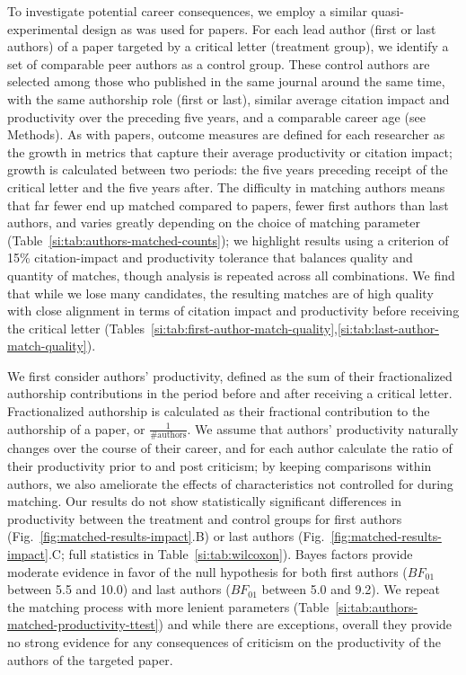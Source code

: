 \documentclass[12pt,a4paper]{article}
\numberwithin{equation}{section}
\def\methods{Methods}
\begin{document}
To investigate potential career consequences, we employ a similar quasi-experimental design as was used for papers.
For each lead author (first or last authors) of a paper targeted by a critical letter (treatment group), we identify a set of comparable peer authors as a control group.
These control authors are selected among those who published in the same journal around the same time, with the same authorship role (first or last), similar average citation impact and productivity over the preceding five years, and a comparable career age (see \methods).
As with papers, outcome measures are defined for each researcher as the growth in metrics that capture their average productivity or citation impact;
growth is calculated between two periods: the five years preceding receipt of the critical letter and the five years after.
The difficulty in matching authors means that far fewer end up matched compared to papers, fewer first authors than last authors, and varies greatly depending on the choice of matching parameter (Table~\ref*{si:tab:authors-matched-counts});
we highlight results using a criterion of 15\% citation-impact and productivity tolerance that balances quality and quantity of matches, though analysis is repeated across all combinations.
We find that while we lose many candidates, the resulting matches are of high quality with close alignment in terms of citation impact and productivity before receiving the critical letter (Tables~\ref*{si:tab:first-author-match-quality},\ref*{si:tab:last-author-match-quality}).

We first consider authors' productivity, defined as the sum of their fractionalized authorship contributions in the period before and after receiving a critical letter. 
Fractionalized authorship is calculated as their fractional contribution to the authorship of a paper, or $\frac{1}{\text{\# authors}}$.
We assume that authors' productivity naturally changes over the course of their career, and for each author calculate the ratio of their productivity prior to and post criticism;
by keeping comparisons within authors, we also ameliorate the effects of characteristics not controlled for during matching. 
Our results do not show statistically significant differences in productivity between the treatment and control groups for first authors (Fig.~\ref*{fig:matched-results-impact}.B) or last authors (Fig.~\ref*{fig:matched-results-impact}.C; full statistics in Table~\ref*{si:tab:wilcoxon}).
Bayes factors provide moderate evidence in favor of the null hypothesis for both first authors ($BF_{01}$ between 5.5 and 10.0) and last authors ($BF_{01}$ between 5.0 and 9.2). 
We repeat the matching process with more lenient parameters (Table~\ref*{si:tab:authors-matched-productivity-ttest}) and while there are exceptions, overall they provide no strong evidence for any consequences of criticism on the productivity of the authors of the targeted paper. 
\end{document}
